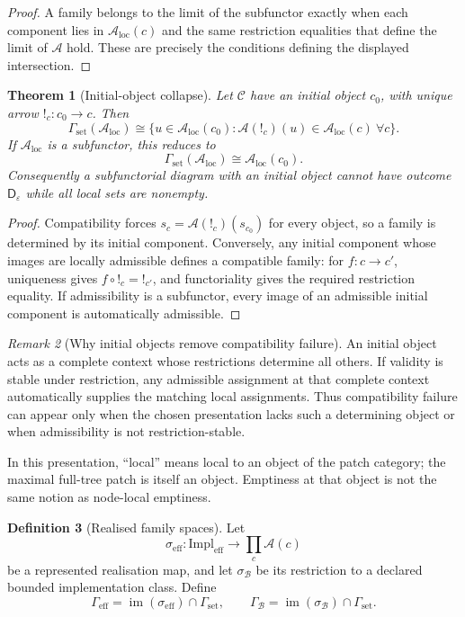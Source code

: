 \documentclass[11pt]{article}
\theoremstyle{plain}
\newtheorem{theorem}{Theorem}[section]
\theoremstyle{definition}
\newtheorem{definition}[theorem]{Definition}
\theoremstyle{remark}
\newtheorem{remark}[theorem]{Remark}
\newcommand{\im}{\operatorname{im}}
\newcommand{\LocalAdm}{\mathcal{A}_{\mathrm{loc}}}
\newcommand{\eps}{\varepsilon}
\begin{document}
\begin{proof}
A family belongs to the limit of the subfunctor exactly when each component lies
in $\LocalAdm(c)$ and the same restriction equalities that define the limit of
$\mathcal A$ hold. These are precisely the conditions defining the displayed
intersection.
\end{proof}

\begin{theorem}[Initial-object collapse]\label{thm:initial-collapse}
Let $\mathcal C$ have an initial object $c_0$, with unique arrow
$!_c:c_0\to c$. Then
\[
\Gamma_{\mathrm{set}}(\LocalAdm)
\cong
\{u\in\LocalAdm(c_0):
\mathcal A(!_c)(u)\in\LocalAdm(c)\ \forall c\}.
\]
If $\LocalAdm$ is a subfunctor, this reduces to
\[
\Gamma_{\mathrm{set}}(\LocalAdm)\cong\LocalAdm(c_0).
\]
Consequently a subfunctorial diagram with an initial object cannot have outcome
$\mathsf D_\eps$ while all local sets are nonempty.
\end{theorem}

\begin{proof}
Compatibility forces $s_c=\mathcal A(!_c)(s_{c_0})$ for every object, so a
family is determined by its initial component. Conversely, any initial component
whose images are locally admissible defines a compatible family: for
$f:c\to c'$, uniqueness gives $f\circ !_c=!_{c'}$, and functoriality gives the
required restriction equality. If admissibility is a subfunctor, every image of
an admissible initial component is automatically admissible.
\end{proof}

\begin{remark}[Why initial objects remove compatibility failure]
An initial object acts as a complete context whose restrictions determine all
others. If validity is stable under restriction, any admissible assignment at
that complete context automatically supplies the matching local assignments.
Thus compatibility failure can appear only when the chosen presentation lacks
such a determining object or when admissibility is not restriction-stable.
\end{remark}

In this presentation, ``local'' means local to an object of the patch category;
the maximal full-tree patch is itself an object. Emptiness at that object is not
the same notion as node-local emptiness.

\begin{definition}[Realised family spaces]\label{def:ECD}
Let
\[
\sigma_{\mathrm{eff}}:\mathrm{Impl}_{\mathrm{eff}}
\to\prod_c\mathcal A(c)
\]
be a represented realisation map, and let $\sigma_{\mathcal B}$ be its
restriction to a declared bounded implementation class. Define
\[
\Gamma_{\mathrm{eff}}
=\im(\sigma_{\mathrm{eff}})\cap\Gamma_{\mathrm{set}},
\qquad
\Gamma_{\mathcal B}
=\im(\sigma_{\mathcal B})\cap\Gamma_{\mathrm{set}}.
\]
\end{definition}
\end{document}
